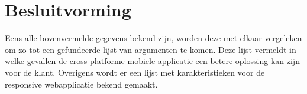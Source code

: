 \section{Besluitvorming}
Eens alle bovenvermelde gegevens bekend zijn, worden deze met elkaar vergeleken om zo tot een gefundeerde lijst van argumenten
te komen. Deze lijst vermeldt in welke gevallen de cross-platforme mobiele applicatie een betere oplossing kan zijn voor de klant.
Overigens wordt er een lijst met karakteristieken voor de responsive webapplicatie bekend gemaakt.
